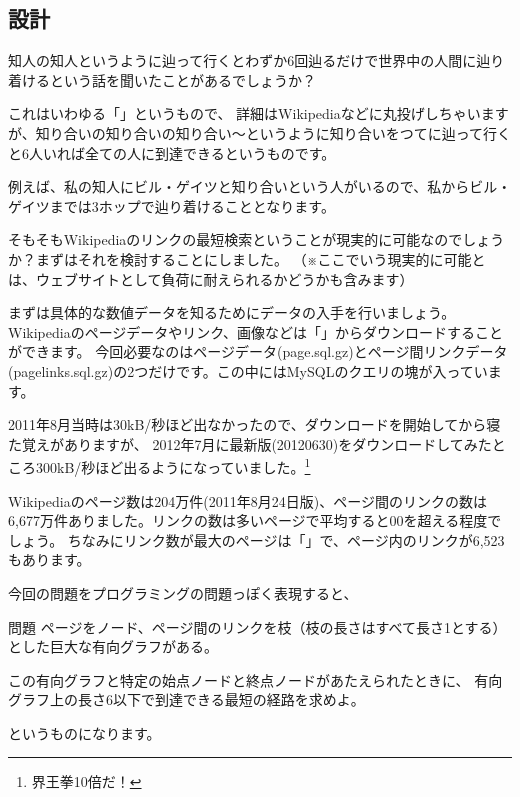 \subsection{設計}
知人の知人というように辿って行くとわずか6回辿るだけで世界中の人間に辿り着けるという話を聞いたことがあるでしょうか？

これはいわゆる「」というもので、
詳細はWikipediaなどに丸投げしちゃいますが、知り合いの知り合いの知り合い〜というように知り合いをつてに辿って行くと6人いれば全ての人に到達できるというものです。

例えば、私の知人にビル・ゲイツと知り合いという人がいるので、私からビル・ゲイツまでは3ホップで辿り着けることとなります。

そもそもWikipediaのリンクの最短検索ということが現実的に可能なのでしょうか？まずはそれを検討することにしました。
（※ここでいう現実的に可能とは、ウェブサイトとして負荷に耐えられるかどうかも含みます）

まずは具体的な数値データを知るためにデータの入手を行いましょう。
Wikipediaのページデータやリンク、画像などは「」からダウンロードすることができます。
今回必要なのはページデータ(page.sql.gz)とページ間リンクデータ(pagelinks.sql.gz)の2つだけです。この中にはMySQLのクエリの塊が入っています。

2011年8月当時は30kB/秒ほど出なかったので、ダウンロードを開始してから寝た覚えがありますが、
2012年7月に最新版(20120630)をダウンロードしてみたところ300kB/秒ほど出るようになっていました。\footnote{界王拳10倍だ！}

Wikipediaのページ数は204万件(2011年8月24日版)、ページ間のリンクの数は6,677万件ありました。リンクの数は多いページで平均すると00を超える程度でしょう。
ちなみにリンク数が最大のページは「」で、ページ内のリンクが6,523もあります。

今回の問題をプログラミングの問題っぽく表現すると、
\begin{itembox}{問題}
ページをノード、ページ間のリンクを枝（枝の長さはすべて長さ1とする）とした巨大な有向グラフがある。

この有向グラフと特定の始点ノードと終点ノードがあたえられたときに、
有向グラフ上の長さ6以下で到達できる最短の経路を求めよ。
\end{itembox}
というものになります。

